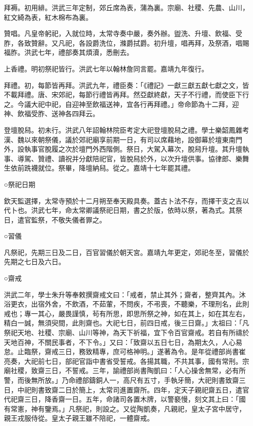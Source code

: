 拜褥。初用緋。洪武三年定制，郊丘席為表，蒲為裏。宗廟、社稷、先農、山川，紅文綺為表，紅木棉布為裏。

贊唱。凡皇帝躬祀，入就位時，太常寺奏中嚴，奏外辦。盥洗、升壇、飲福、受胙，各致贊辭。又凡祀，各設爵洗位，滌爵拭爵。初升壇，唱再拜，及祭酒，唱賜福胙。洪武七年，禮部奏其煩瀆，悉刪去。

上香禮。明初祭祀皆行。洪武七年以翰林詹同言罷。嘉靖九年復行。

拜禮。初，每節皆再拜。洪武九年，禮臣奏：「《禮記》一獻三獻五獻七獻之文，皆不載拜禮。唐、宋郊祀，每節行禮皆再拜。然亞獻終獻，天子不行禮，而使臣下行之。今議大祀中祀，自迎神至飲福送神，宜各行再拜禮。」帝命節為十二拜，迎神、飲福受胙、送神各四拜云。

登壇脫舄。初未行。洪武八年詔翰林院臣考定大祀登壇脫舄之禮。學士樂韶鳳雜考漢、魏以來朝祭儀，議於郊祀廟享前期一日，有司以席藉地，設御幕於壇東南門外，設執事官脫履之次於壇門外西階側。祭日，大駕入幕次，脫舄升壇。其升壇執事、導駕、贊禮、讀祝并分獻陪祀官，皆脫舄於外，以次升壇供事。協律郎、樂舞生依前跣襪就位。祭畢，降壇納舄。從之。嘉靖十七年罷其禮。

○祭祀日期

欽天監選擇，太常寺預於十二月朔至奉天殿具奏。蓋古卜法不存，而擇干支之吉以代卜也。洪武七年，命太常卿議祭祀日期，書之於版，依時以祭，著為式。其祭日，遣官監祭，不敬失儀者罪之。

○習儀

凡祭祀，先期三日及二日，百官習儀於朝天宮。嘉靖九年更定，郊祀冬至，習儀於先期之七日及六日。

○齋戒

洪武二年，學士朱升等奉敕撰齋戒文曰：「戒者，禁止其外；齋者，整齊其內。沐浴更衣，出宿外舍，不飲酒，不茹葷，不問疾，不弔喪，不聽樂，不理刑名，此則戒也；專一其心，嚴畏謹慎，茍有所思，即思所祭之神，如在其上，如在其左右，精白一誠，無須臾間，此則齋也。大祀七日，前四日戒，後三日齋。」太祖曰：「凡祭祀天地、社稷、宗廟、山川等神，為天下祈福，宜下令百官齋戒。若自有所禱於天地百神，不關民事者，不下令。」又曰：「致齋以五日七日，為期太久，人心易怠。止臨祭，齋戒三日，務致精專，庶可格神明。」遂著為令。是年從禮部尚書崔亮奏，大祀前七日，部祀官詣中書省受誓戒。各揚其職，不共其事，國有常刑。宗廟社稷，致齋三日，不誓戒。三年，諭禮部尚書陶凱曰：「人心操舍無常，必有所警，而後無所放。」乃命禮部鑄銅人一，高尺有五寸，手執牙簡，大祀則書致齋三日，中祀則書致齋二日於簡上，太常司進置齋所。四年，定天子親祀齋五日，遣官代祀齋三日，降香齋一日。五年，命諸司各置木牌，以警褻慢，刻文其上曰：「國有常憲，神有鑒焉。」凡祭祀，則設之。又從陶凱奏，凡親祀，皇太子宮中居守，親王戎服侍從。皇太子親王雖不陪祀，一體齋戒。

